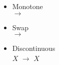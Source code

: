 {\begin{columns}
\begin{column}{5cm}
{\begin{tabular}{|l|l|l|l|l|l|}
				\end{tabular}
				}
				\end{column}
				\begin{column}{6cm}
					\begin{small}
					\begin{itemize}
						\item<2> Monotone\\
						  $\rightarrow$  
						\item<3> Swap\\
						  $\rightarrow$  
						\item<4> Discontinuous\\
						 $X$  $\rightarrow$   $X$
					\end{itemize}
					\end{small}
				\end{column}

				\end{columns}
			}
